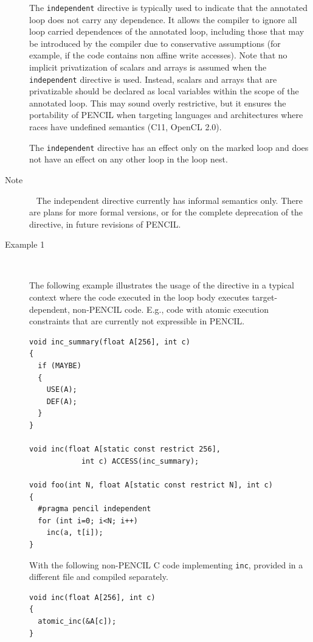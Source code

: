 \documentclass{carp}
\begin{document}
\begin{description}
The \lstinline!independent! directive is typically used to indicate
that the annotated loop does not carry any dependence.  It allows the
compiler to ignore all loop carried dependences of the annotated loop,
including those that may be introduced by the compiler due to
conservative assumptions (for example, if the code contains non affine
write accesses).
Note that no implicit privatization of scalars and arrays is assumed when
the \lstinline!independent! directive is used.  Instead, scalars and
arrays that are privatizable should be declared as local variables
within the scope of the annotated loop.
This may sound overly restrictive, but it ensures the portability of
PENCIL when targeting languages and architectures where races have
undefined semantics (C11, OpenCL 2.0).

The \lstinline!independent! directive has an effect only on the marked loop
and does not have an effect on any other loop in the loop nest.

\item [Note]~
The independent directive currently has informal semantics only. There
are plans for more formal versions, or for the complete deprecation of
the directive, in future revisions of PENCIL.

\item [Example 1]~

  The following example illustrates the usage of the directive in a
  typical context where the code executed in the loop body executes
  target-dependent, non-PENCIL code. E.g., code with atomic execution
  constraints that are currently not expressible in PENCIL.
  \begin{lstlisting}[language=pencil]
void inc_summary(float A[256], int c)
{
  if (MAYBE)
  {
    USE(A);
    DEF(A);
  }
}

void inc(float A[static const restrict 256],
            int c) ACCESS(inc_summary);

void foo(int N, float A[static const restrict N], int c)
{
  #pragma pencil independent
  for (int i=0; i<N; i++)
    inc(a, t[i]);
}  
  \end{lstlisting}

  With the following non-PENCIL C code implementing \lstinline!inc!,
  provided in a different file and compiled separately.
  \begin{lstlisting}[language=pencil]
void inc(float A[256], int c)
{
  atomic_inc(&A[c]);
}
  \end{lstlisting}


\end{description}
\end{document}
